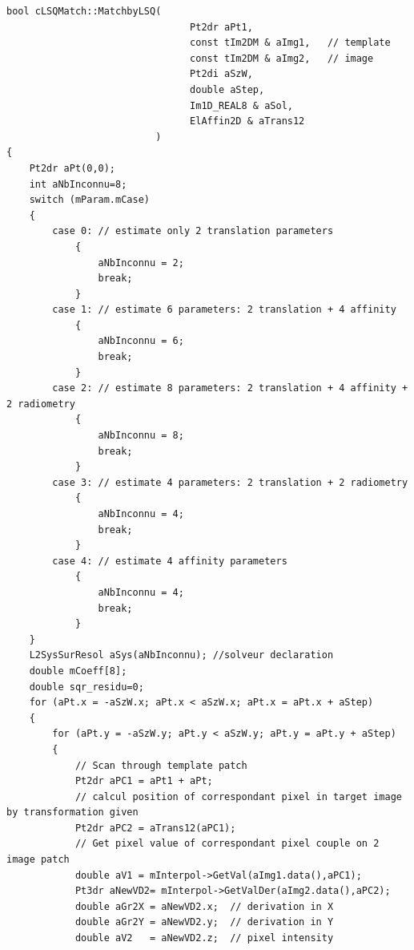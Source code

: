 \documentclass[twoside]{article}
\begin{document}
\begin{lstlisting}
bool cLSQMatch::MatchbyLSQ(
                                Pt2dr aPt1,
                                const tIm2DM & aImg1,   // template
                                const tIm2DM & aImg2,   // image
                                Pt2di aSzW,
                                double aStep,
                                Im1D_REAL8 & aSol,
                                ElAffin2D & aTrans12
                          )
{
    Pt2dr aPt(0,0);
    int aNbInconnu=8;
    switch (mParam.mCase)
    {
        case 0: // estimate only 2 translation parameters
            {
                aNbInconnu = 2;
                break;
            }
        case 1: // estimate 6 parameters: 2 translation + 4 affinity
            {
                aNbInconnu = 6;
                break;
            }
        case 2: // estimate 8 parameters: 2 translation + 4 affinity + 2 radiometry
            {
                aNbInconnu = 8;
                break;
            }
        case 3: // estimate 4 parameters: 2 translation + 2 radiometry 
            {
                aNbInconnu = 4;
                break;
            }
        case 4: // estimate 4 affinity parameters 
            {
                aNbInconnu = 4;
                break;
            }
    }
    L2SysSurResol aSys(aNbInconnu); //solveur declaration
    double mCoeff[8];
    double sqr_residu=0;
    for (aPt.x = -aSzW.x; aPt.x < aSzW.x; aPt.x = aPt.x + aStep)
    {
        for (aPt.y = -aSzW.y; aPt.y < aSzW.y; aPt.y = aPt.y + aStep)
        {
            // Scan through template patch
            Pt2dr aPC1 = aPt1 + aPt;
            // calcul position of correspondant pixel in target image by transformation given
            Pt2dr aPC2 = aTrans12(aPC1);
            // Get pixel value of correspondant pixel couple on 2 image patch
            double aV1 = mInterpol->GetVal(aImg1.data(),aPC1);    
            Pt3dr aNewVD2= mInterpol->GetValDer(aImg2.data(),aPC2);   
            double aGr2X = aNewVD2.x;  // derivation in X
            double aGr2Y = aNewVD2.y;  // derivation in Y
            double aV2   = aNewVD2.z;  // pixel intensity
            

\end{lstlisting}
\end{document}
